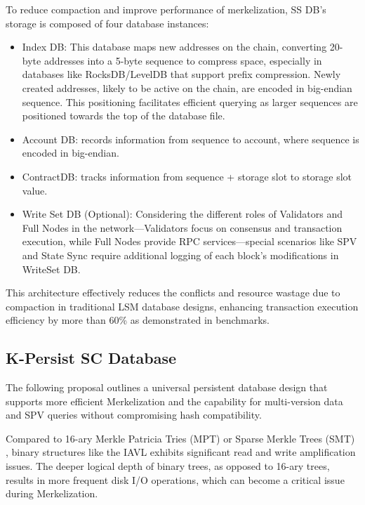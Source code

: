 To reduce compaction and improve performance of merkelization, SS DB's storage is composed of four database instances:

\begin{itemize}
    \item Index DB: This database maps new addresses on the chain, converting 20-byte addresses into a 5-byte sequence to compress space, especially in databases like RocksDB/LevelDB that support prefix compression. Newly created addresses, likely to be active on the chain, are encoded in big-endian sequence. This positioning facilitates efficient querying as larger sequences are positioned towards the top of the database file.
    \item Account DB: records information from sequence to account, where sequence is encoded in big-endian.
    \item ContractDB: tracks information from sequence + storage slot to storage slot value.
    \item Write Set DB (Optional): Considering the different roles of Validators and Full Nodes in the network—Validators focus on consensus and transaction execution, while Full Nodes provide RPC services—special scenarios like SPV and State Sync require additional logging of each block's modifications in WriteSet DB.
\end{itemize}

This architecture effectively reduces the conflicts and resource wastage due to compaction in traditional LSM database designs, enhancing transaction execution efficiency by more than 60\% as demonstrated in benchmarks.

\subsection{K-Persist SC Database}

The following proposal outlines a universal persistent database design that supports more efficient Merkelization and the capability for multi-version data and SPV queries without compromising hash compatibility. 

Compared to 16-ary Merkle Patricia Tries (MPT) \cite{ethereum_patricia_merkle_trie} or Sparse Merkle Trees (SMT) \cite{fichter_sparse_merkle_tree}, binary structures like the IAVL exhibits significant read and write amplification issues. The deeper logical depth of binary trees, as opposed to 16-ary trees, results in more frequent disk I/O operations, which can become a critical issue during Merkelization.

